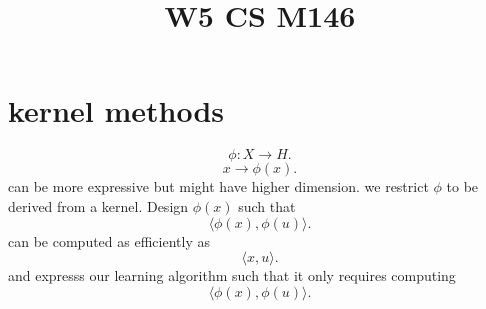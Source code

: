 \documentclass[a4paper,12pt]{scrartcl} %
\theoremstyle{darktheorem}
\begin{document}
\title{\color{sectioncolor}W5 CS M146}
\author{}
\date{}
\maketitle

\thispagestyle{fancy}
\section{kernel methods}
\[
\phi: X \rightarrow H
.\] 
\[
x \rightarrow \phi(x)
.\] 
can be more expressive but might have higher dimension.
we restrict $\phi $ to be derived from a kernel. Design $\phi(x)$ such that
\[
\langle \phi(x), \phi(u) \rangle
.\] 
can be computed as efficiently as 
\[
\langle x , u \rangle
.\] 
and expresss our learning algorithm such that it only requires computing
 \[
\langle \phi(x), \phi(u) \rangle
.\] 
\end{document}
